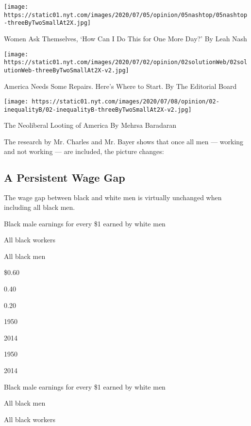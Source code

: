 \texttt{[image: https://static01.nyt.com/images/2020/07/05/opinion/05nashtop/05nashtop-threeByTwoSmallAt2X.jpg]}

Women Ask Themselves, `How Can I Do This for One More Day?' By Leah Nash

\href{https://www.nytimes.com/2020/07/02/opinion/sunday/income-inequality-solutions.html?action=click\&pgtype=Article\&state=default\&region=MAIN_CONTENT_2\&context=storylines_related_links}{}

\texttt{[image: https://static01.nyt.com/images/2020/07/02/opinion/02solutionWeb/02solutionWeb-threeByTwoSmallAt2X-v2.jpg]}

America Needs Some Repairs. Here's Where to Start. By The Editorial
Board

\href{https://www.nytimes.com/2020/07/02/opinion/private-equity-inequality.html?action=click\&pgtype=Article\&state=default\&region=MAIN_CONTENT_2\&context=storylines_related_links}{}

\texttt{[image: https://static01.nyt.com/images/2020/07/08/opinion/02-inequalityB/02-inequalityB-threeByTwoSmallAt2X-v2.jpg]}

The Neoliberal Looting of America By Mehrsa Baradaran

The research by Mr. Charles and Mr. Bayer shows that once all men ---
working and not working --- are included, the picture changes:

\hypertarget{a-persistent-wage-gap}{%
\subsection{A Persistent Wage Gap}\label{a-persistent-wage-gap}}

The wage gap between black and white men is virtually unchanged when
including all black men.

Black male earnings for every \$1 earned by white men

All black workers

All black men

\$0.60

0.40

0.20

1950

2014

1950

2014

Black male earnings for every \$1 earned by white men

All black men

All black workers

